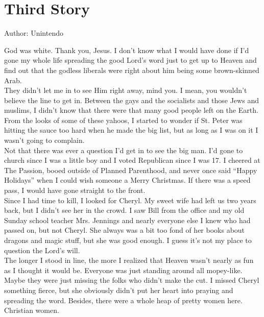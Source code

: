\chapter{Third Story}

Author: Unintendo

God was white. Thank you, Jesus. I don't know what I would have done if I'd gone my whole life spreading the good Lord's word just to get up to Heaven and find out that the godless liberals were right about him being some brown-skinned Arab.\\



They didn't let me in to see Him right away, mind you. I mean, you wouldn't believe the line to get in. Between the gays and the socialists and those Jews and muslims, I didn't know that there were that many good people left on the Earth. From the looks of some of these yahoos, I started to wonder if St. Peter was hitting the sauce too hard when he made the big list, but as long as I was on it I wasn't going to complain.\\



Not that there was ever a question I'd get in to see the big man. I'd gone to church since I was a little boy and I voted Republican since I was 17. I cheered at The Passion, booed outside of Planned Parenthood, and never once said \enquote{Happy Holidays} when I could wish someone a Merry Christmas. If there was a speed pass, I would have gone straight to the front.\\



Since I had time to kill, I looked for Cheryl. My sweet wife had left us two years back, but I didn't see her in the crowd. I saw Bill from the office and my old Sunday school teacher Mrs. Jennings and nearly everyone else I knew who had passed on, but not Cheryl. She always was a bit too fond of her books about dragons and magic stuff, but she was good enough. I guess it's not my place to question the Lord's will.\\



The longer I stood in line, the more I realized that Heaven wasn't nearly as fun as I thought it would be. Everyone was just standing around all mopey-like. Maybe they were just missing the folks who didn't make the cut. I missed Cheryl something fierce, but she obviously didn't put her heart into praying and spreading the word. Besides, there were a whole heap of pretty women here. Christian women.\\



